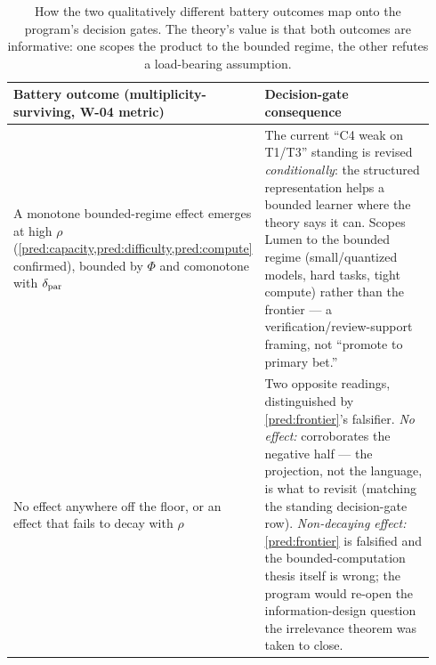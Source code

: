\begin{table}[t]
\centering
\small
\renewcommand{\arraystretch}{1.15}
\begin{tabular}{@{}>{\raggedright\arraybackslash}p{0.46\linewidth}>{\raggedright\arraybackslash}p{0.48\linewidth}@{}}
\toprule
Battery outcome (multiplicity-surviving, W-04 metric) & Decision-gate consequence \\
\midrule
A monotone bounded-regime effect emerges at high $\rho$
(\cref{pred:capacity,pred:difficulty,pred:compute} confirmed), bounded by
$\Phi$ and comonotone with $\delta_{\mathrm{par}}$ &
  The current ``C4 weak on T1/T3'' standing is revised \emph{conditionally}:
  the structured representation helps a bounded learner where the theory says it
  can. Scopes Lumen to the bounded regime (small/quantized models, hard tasks,
  tight compute) rather than the frontier --- a verification/review-support
  framing, not ``promote to primary bet.'' \\[2pt]
No effect anywhere off the floor, or an effect that fails to decay with $\rho$ &
  Two opposite readings, distinguished by \cref{pred:frontier}'s falsifier.
  \emph{No effect:} corroborates the negative half --- the projection, not the
  language, is what to revisit (matching the standing decision-gate row).
  \emph{Non-decaying effect:} \cref{pred:frontier} is falsified and the
  bounded-computation thesis itself is wrong; the program would re-open the
  information-design question the irrelevance theorem was taken to close. \\
\bottomrule
\end{tabular}
\caption{How the two qualitatively different battery outcomes map onto the
program's decision gates. The theory's value is that both outcomes are
informative: one scopes the product to the bounded regime, the other refutes a
load-bearing assumption.}
\label{tab:pred-gates}
\end{table}

